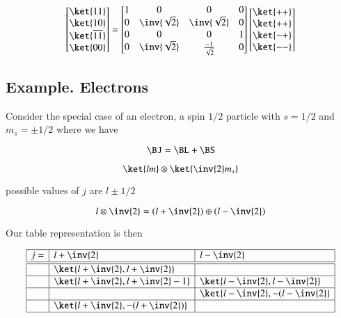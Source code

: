 \begin{equation}\label{eqn:qmTwoL18:270}
\begin{bmatrix}
\ket{11} \\
\ket{10} \\
\ket{\overline{11}} \\
\ket{00}
\end{bmatrix}
=
\begin{bmatrix}
1 & 0 & 0 & 0 \\
0 & \inv{\sqrt{2}} & \inv{\sqrt{2}} & 0 \\
0 & 0 & 0 & 1 \\
0 & \inv{\sqrt{2}} & \frac{-1}{\sqrt{2}} & 0 \\
\end{bmatrix}
\begin{bmatrix}
\ket{++} \\
\ket{++} \\
\ket{-+} \\
\ket{--}
\end{bmatrix}
\end{equation}

\subsection{Example.  Electrons}

Consider the special case of an electron, a spin $1/2$ particle with $s = 1/2$ and $m_s = \pm 1/2$ where we have 

\begin{equation}\label{eqn:qmTwoL18:290}
\BJ = \BL + \BS
\end{equation}

\begin{equation}\label{eqn:qmTwoL18:310}
\ket{lm} \otimes \ket{\inv{2} m_s}
\end{equation}

possible values of $j$ are $l \pm 1/2$

\begin{equation}\label{eqn:qmTwoL18:330}
l \otimes \inv{2} = 
\left(
l + \inv{2}
\right)
\oplus
\left(
l - \inv{2}
\right)
\end{equation}

Our table representation is then

\begin{equation}\label{eqn:qmTwoL18:350}
\begin{array}{| l | l | l |}
\hline
j = & l + \inv{2} 			& l - \inv{2} \\
\hline
\hline
  &  \ket{l + \inv{2}, l + \inv{2}}	 	&					 \\
\hline
  &  \ket{l + \inv{2}, l + \inv{2} - 1}	&  \ket{l - \inv{2}, l - \inv{2}}	 \\
\hline
  &                                     & \ket{l - \inv{2}, -(l - \inv{2}}	 \\
\hline
  &  \ket{l + \inv{2}, -(l + \inv{2})}	&					 \\
\hline
\end{array}
\end{equation}

